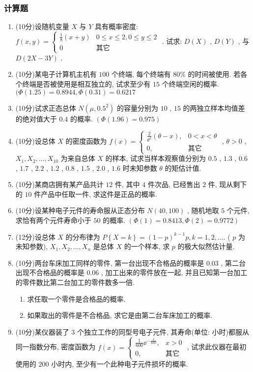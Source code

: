 \subsubsection{计算题}
 \begin{enumerate}
	\item (10分)设随机变量 $X$ 与 $Y$ 具有概率密度: $f(x,y)=
	\begin{cases}
	\frac{1}{8}(x+y) & 0\leq x\leq 2, 0\leq y\leq 2\\
	0 & \text{其它}
	\end{cases}
	$ . 试求: $D(X)$ , $D(Y)$ , 与 $D(2X-3Y)$ .

	\item (10分)某电子计算机主机有 $100$ 个终端, 每个终端有 $80\%$ 的时间被使用. 
	若各个终端是否被使用是相互独立的, 试求至少有 $15$ 个终端空闲的概率. $(\varPhi(1.25)=0.8944, \varPhi(0.31)=0.6217$
	
	\item (10分)试求正态总体 $N\left(\mu,0.5^2\right)$ 的容量分别为 $10$ , $15$ 的两独立样本均值差的绝对值大于 $0.4$ 的概率. $(\varPhi(1.96)=0.975)$
	
	\item (10分)设总体 $X$ 的密度函数为 $f(x)=
	\begin{cases}
	\frac{2}{\theta^2}(\theta-x), & 0<x<\theta\\
	0, & \text{其它}
	\end{cases}
	$ , $\theta>0$ , $X_1,X_2,\ldots,X_{10}$ 为来自总体 $X$ 的样本, 试求当样本观察值分别为 $0.5$ , $1.3$ , $0.6$ , $1.7$ , $2.2$ , $1.2$ , $0.8$ , $1.5$ , $2.0$ , $1.6$ 时未知参数 $\theta$ 的矩估计值.

	\item (10分)某商店拥有某产品共计 $12$ 件, 其中 $4$ 件次品, 已经售出 $2$ 件, 现从剩下的 $10$ 件产品中任取一件, 求这件是正品的概率.
	
	\item (10分)设某种电子元件的寿命服从正态分布 $N(40,100)$ , 随机地取 $5$ 个元件, 求恰有两个元件寿命小于 $50$ 的概率. $(\varPhi(1)=0.8413, \varPhi(2)=0.9772)$

	\item (12分)设总体 $X$ 的分布律为 $P\left\{X=k\right\}=(1-p)^{k-1}p, k=1,2,\ldots.$ ( $p$ 为未知参数), $X_1,X_2,\ldots,X_n$ 是总体 $X$ 的一个样本, 求 $p$ 的极大似然估计量.

	\item (10分)两台车床加工同样的零件, 第一台出现不合格品的概率是 $0.03$ , 第二台出现不合格品的概率是 $0.06$ , 加工出来的零件放在一起, 并且已知第一台加工的零件数比第二台加工的零件数多一倍.
	\begin{enumerate}
		\item 求任取一个零件是合格品的概率.
		\item 如果取出的零件是不合格品, 求它是由第二台车床加工的概率.
	\end{enumerate}

	\item (10分)某仪器装了 $3$ 个独立工作的同型号电子元件, 其寿命(单位: 小时)都服从同一指数分布, 密度函数为 $f(x)=
	\begin{cases}
	\frac{1}{600}\ee^{-\frac{x}{600}}, & x>0\\
	0, & \text{其它}
	\end{cases}
	$ , 试求此仪器在最初使用的 $200$ 小时内, 至少有一个此种电子元件损坏的概率.
\end{enumerate}